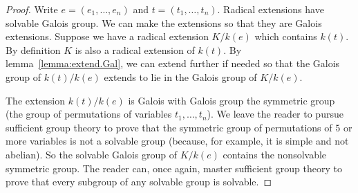 \begin{proof}
Write \(e=(e_1,\dots,e_n)\) and \(t=(t_1,\dots,t_n)\).
Radical extensions have solvable Galois group.
We can make the extensions so that they are Galois extensions.
Suppose we have a radical extension \(K/k(e)\) which contains \(k(t)\).
By definition \(K\) is also a radical extension of \(k(t)\).
By lemma~\vref{lemma:extend.Gal}, we can extend further if needed so that the Galois group of \(k(t)/k(e)\) extends to lie in the Galois group of \(K/k(e)\).

The extension \(k(t)/k(e)\) is Galois with Galois group the symmetric group (the group of permutations of variables \(t_1,\dots,t_n\)).
We leave the reader to pursue sufficient group theory to prove that the symmetric group of permutations of \(5\) or more variables is not a solvable group (because, for example, it is simple and not abelian).
So the solvable Galois group of \(K/k(e)\) contains the nonsolvable symmetric group.
The reader can, once again, master sufficient group theory to prove that every subgroup of any solvable group is solvable.
\end{proof}
